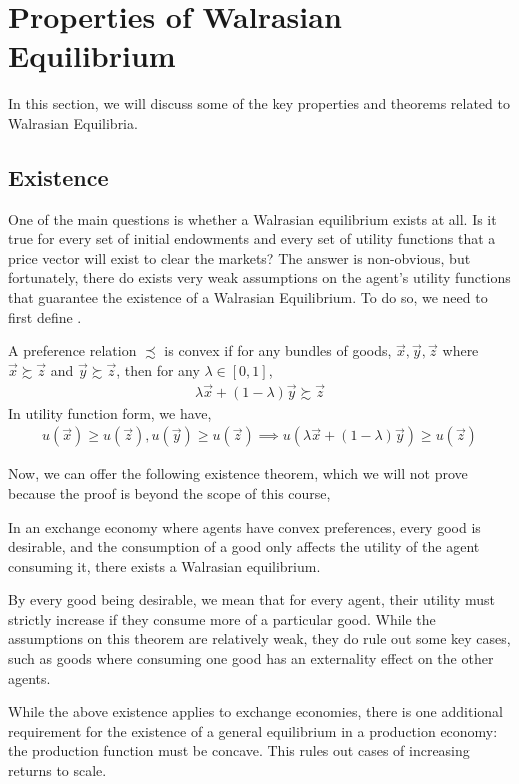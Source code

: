 \section{Properties of Walrasian Equilibrium}
In this section, we will discuss some of the key properties and theorems related to Walrasian Equilibria.

\subsection*{Existence}
One of the main questions is whether a Walrasian equilibrium exists at all. Is it true for every set of initial endowments and every set of utility functions that a price vector will exist to clear the markets? The answer is non-obvious, but fortunately, there do exists very weak assumptions on the agent's utility functions that guarantee the existence of a Walrasian Equilibrium. To do so, we need to first define .

\begin{definition*}
    A preference relation $\precsim$ is convex if for any bundles of goods, $\vec{x}, \vec{y}, \vec{z}$ where $\vec{x} \succsim \vec{z} $ and $\vec{y} \succsim \vec{z}$, then for any $\lambda \in [0, 1]$,
    \begin{align*}
        \lambda \vec{x} + (1 - \lambda) \vec{y} \succsim \vec{z}
    \end{align*}
    In utility function form, we have,
    \begin{align*}
        u(\vec{x}) \geq u(\vec{z}), u(\vec{y}) \geq u(\vec{z}) \implies u(\lambda \vec{x} + (1 - \lambda)\vec{y}) \geq u(\vec{z})
    \end{align*}
\end{definition*}

Now, we can offer the following existence theorem, which we will not prove because the proof is beyond the scope of this course,
\begin{theorem*}
    In an exchange economy where agents have convex preferences, every good is desirable, and the consumption of a good only affects the utility of the agent consuming it, there exists a Walrasian equilibrium. 
\end{theorem*}
By every good being desirable, we mean that for every agent, their utility must strictly increase if they consume more of a particular good. While the assumptions on this theorem are relatively weak, they do rule out some key cases, such as goods where consuming one good has an externality effect on the other agents.

While the above existence applies to exchange economies, there is one additional requirement for the existence of a general equilibrium in a production economy: the production function must be concave. This rules out cases of increasing returns to scale. 